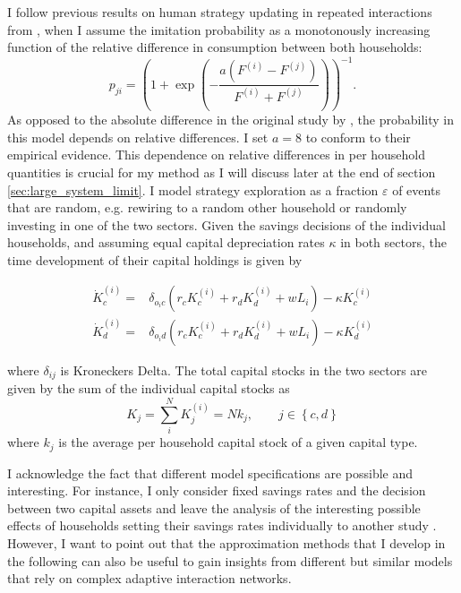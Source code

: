 I follow previous results on human strategy updating in repeated interactions from \cite{Traulsen2010}, when I assume the imitation probability as a monotonously increasing function of the relative difference in consumption between both households:
\begin{equation}
	p_{ji} =  \left(1 + \exp \left(- \frac{a(F^{(i)} - F^{(j)})}{F^{(i)} + F^{(j)}} \right) \right)^{-1}.
    \label{eq:approx_ip}
\end{equation}
As opposed to the absolute difference in the original study by \cite{Traulsen2010}, the probability in this model depends on relative differences. 
I set $a = 8$ to conform to their empirical evidence. This dependence on relative differences in per household quantities is crucial for my method as I will discuss later at the end of section \ref{sec:large_system_limit}.
I model strategy exploration as a fraction $\varepsilon$ of events that are random, e.g. rewiring to a random other household or randomly investing in one of the two sectors.
Given the savings decisions of the individual households, and assuming equal capital depreciation rates $\kappa$ in both sectors, the time development of their capital holdings is given by

\begin{align}
	\dot{K}_c^{(i)} =& \delta_{o_ic} \left( r_c K_c^{(i)} + r_d K_d^{(i)} + w L_i \right) - \kappa K_c^{(i)} \label{eq:approx_ci}\\
	\dot{K}_d^{(i)} =& \delta_{o_id} \left( r_c K_c^{(i)} + r_d K_d^{(i)} + w L_i \right) - \kappa K_d^{(i)} \label{eq:approx_di}
\end{align}

where $\delta_{ij}$ is Kroneckers Delta. The total capital stocks in the two sectors are given by the sum of the individual capital stocks as
\begin{equation}
    K_j = \sum_i^N K_j^{(i)} = N k_j, \qquad j \in \left\{ c, d \right\}
\end{equation}
where $k_j$ is the average per household capital stock of a given capital type.

I acknowledge the fact that different model specifications are possible and interesting.
For instance, I only consider fixed savings rates and the decision between two capital assets and leave the analysis of the interesting possible effects of households setting their savings rates individually to another study \citep{Asano2019}.
However, I want to point out that the approximation methods that I develop in the following can also be useful to gain insights from different but similar models that rely on complex adaptive interaction networks.


